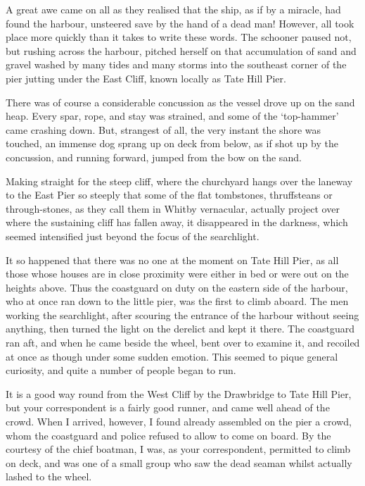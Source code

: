 A great awe came on all as they realised that the ship, as if by a miracle, had found the harbour, unsteered save by the hand of a dead man! However, all took place more quickly than it takes to write these words. The schooner paused not, but rushing across the harbour, pitched herself on that accumulation of sand and gravel washed by many tides and many storms into the southeast corner of the pier jutting under the East Cliff, known locally as Tate Hill Pier. 

There was of course a considerable concussion as the vessel drove up on the sand heap. Every spar, rope, and stay was strained, and some of the `top-hammer' came crashing down. But, strangest of all, the very instant the shore was touched, an immense dog sprang up on deck from below, as if shot up by the concussion, and running forward, jumped from the bow on the sand. 

Making straight for the steep cliff, where the churchyard hangs over the laneway to the East Pier so steeply that some of the flat tombstones, thruffsteans or through-stones, as they call them in Whitby vernacular, actually project over where the sustaining cliff has fallen away, it disappeared in the darkness, which seemed intensified just beyond the focus of the searchlight. 

It so happened that there was no one at the moment on Tate Hill Pier, as all those whose houses are in close proximity were either in bed or were out on the heights above. Thus the coastguard on duty on the eastern side of the harbour, who at once ran down to the little pier, was the first to climb aboard. The men working the searchlight, after scouring the entrance of the harbour without seeing anything, then turned the light on the derelict and kept it there. The coastguard ran aft, and when he came beside the wheel, bent over to examine it, and recoiled at once as though under some sudden emotion. This seemed to pique general curiosity, and quite a number of people began to run. 

It is a good way round from the West Cliff by the Drawbridge to Tate Hill Pier, but your correspondent is a fairly good runner, and came well ahead of the crowd. When I arrived, however, I found already assembled on the pier a crowd, whom the coastguard and police refused to allow to come on board. By the courtesy of the chief boatman, I was, as your correspondent, permitted to climb on deck, and was one of a small group who saw the dead seaman whilst actually lashed to the wheel. 

